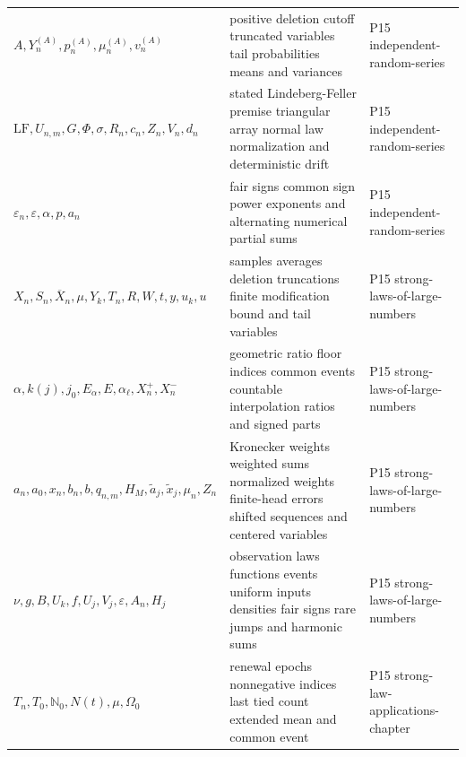 \begin{longtable}{@{}p{}p{}p{}@{}}
\(A,\allowbreak Y_n^{(A)},\allowbreak p_n^{(A)},\allowbreak \mu_n^{(A)},\allowbreak v_n^{(A)}\) & positive deletion cutoff truncated variables tail probabilities means and variances & P15 independent-\allowbreak{}random-\allowbreak{}series \\
\(\mathrm{LF},\allowbreak U_{n,m},\allowbreak G,\allowbreak \Phi,\allowbreak \sigma,\allowbreak R_n,\allowbreak c_n,\allowbreak Z_n,\allowbreak V_n,\allowbreak d_n\) & stated Lindeberg-Feller premise triangular array normal law normalization and deterministic drift & P15 independent-\allowbreak{}random-\allowbreak{}series \\
\(\varepsilon_n,\allowbreak \varepsilon,\allowbreak \alpha,\allowbreak p,\allowbreak a_n\) & fair signs common sign power exponents and alternating numerical partial sums & P15 independent-\allowbreak{}random-\allowbreak{}series \\
\(X_n,\allowbreak S_n,\allowbreak \overline X_n,\allowbreak \mu,\allowbreak Y_k,\allowbreak T_n,\allowbreak R,\allowbreak W,\allowbreak t,\allowbreak y,\allowbreak u_k,\allowbreak u\) & samples averages deletion truncations finite modification bound and tail variables & P15 strong-\allowbreak{}laws-\allowbreak{}of-\allowbreak{}large-\allowbreak{}numbers \\
\(\alpha,\allowbreak k(j),\allowbreak j_0,\allowbreak E_\alpha,\allowbreak E,\allowbreak \alpha_\ell,\allowbreak X_n^+,\allowbreak X_n^-\) & geometric ratio floor indices common events countable interpolation ratios and signed parts & P15 strong-\allowbreak{}laws-\allowbreak{}of-\allowbreak{}large-\allowbreak{}numbers \\
\(a_n,\allowbreak a_0,\allowbreak x_n,\allowbreak b_n,\allowbreak b,\allowbreak q_{n,m},\allowbreak H_M,\allowbreak \widetilde a_j,\allowbreak \widetilde x_j,\allowbreak \mu_n,\allowbreak Z_n\) & Kronecker weights weighted sums normalized weights finite-head errors shifted sequences and centered variables & P15 strong-\allowbreak{}laws-\allowbreak{}of-\allowbreak{}large-\allowbreak{}numbers \\
\(\nu,\allowbreak g,\allowbreak B,\allowbreak U_k,\allowbreak f,\allowbreak U_j,\allowbreak V_j,\allowbreak \varepsilon,\allowbreak A_n,\allowbreak H_j\) & observation laws functions events uniform inputs densities fair signs rare jumps and harmonic sums & P15 strong-\allowbreak{}laws-\allowbreak{}of-\allowbreak{}large-\allowbreak{}numbers \\
\(T_n,\allowbreak T_0,\allowbreak \mathbb N_0,\allowbreak N(t),\allowbreak \mu,\allowbreak \Omega_0\) & renewal epochs nonnegative indices last tied count extended mean and common event & P15 strong-\allowbreak{}law-\allowbreak{}applications-\allowbreak{}chapter \\

\end{longtable}
